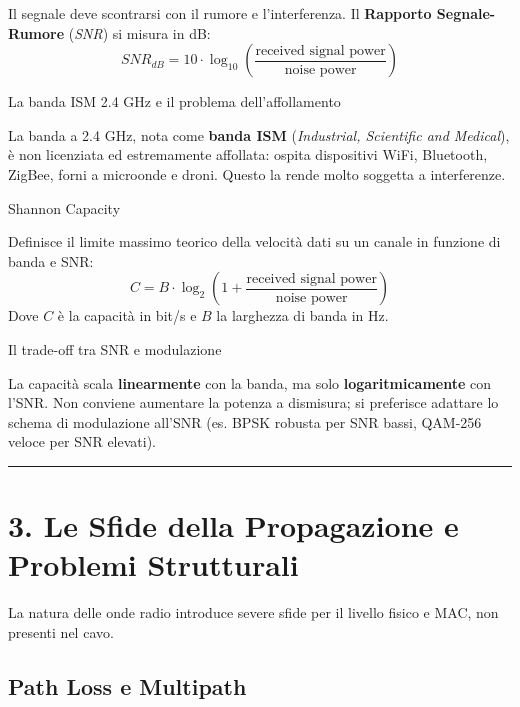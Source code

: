 \documentclass[
  italian,
  openany]{book}
\begin{document}
Il segnale deve scontrarsi con il rumore e l'interferenza. Il
\textbf{Rapporto Segnale-Rumore} (\emph{SNR}) si misura in dB:
\[SNR_{dB}=10\cdot \log_{10}\left(\frac{\text{received signal power}}{\text{noise power}}\right)\]

\begin{calloutnote}{La banda ISM 2.4 GHz e il problema dell’affollamento}

La banda a 2.4 GHz, nota come \textbf{banda ISM} (\emph{Industrial,
Scientific and Medical}), è non licenziata ed estremamente affollata:
ospita dispositivi WiFi, Bluetooth, ZigBee, forni a microonde e droni.
Questo la rende molto soggetta a interferenze.

\end{calloutnote}

\begin{calloutdefinition}{Shannon Capacity}

Definisce il limite massimo teorico della velocità dati su un canale in
funzione di banda e SNR:
\[C = B \cdot \log_{2}\!\left(1 + \frac{\text{received signal power}}{\text{noise power}}\right)\]
Dove \(C\) è la capacità in bit/s e \(B\) la larghezza di banda in Hz.

\end{calloutdefinition}

\begin{callouttip}{Il trade-off tra SNR e modulazione}

La capacità scala \textbf{linearmente} con la banda, ma solo
\textbf{logaritmicamente} con l'SNR. Non conviene aumentare la potenza a
dismisura; si preferisce adattare lo schema di modulazione all'SNR (es.
BPSK robusta per SNR bassi, QAM-256 veloce per SNR elevati).

\end{callouttip}

\begin{center}\rule{0.5\linewidth}{0.5pt}\end{center}

\section{3. Le Sfide della Propagazione e Problemi
Strutturali}\label{le-sfide-della-propagazione-e-problemi-strutturali}

La natura delle onde radio introduce severe sfide per il livello fisico
e MAC, non presenti nel cavo.

\subsection{Path Loss e Multipath}\label{path-loss-e-multipath}
\end{document}
